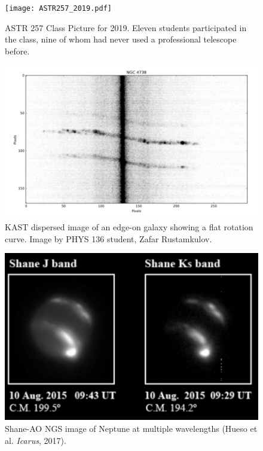\documentclass[12pt]{article}
\begin{document}
\newpage

\begin{figure}[t!]
  \centering
\texttt{[image: ASTR257\_2019.pdf]}
  \caption{ASTR 257 Class Picture for 2019.  Eleven students participated in the class, nine of whom had never used a professional telescope before.}
\end{figure}

\begin{figure}[t!]
  \centering
\includegraphics[width=15cm]{fig1.pdf}
  \caption{KAST dispersed image of an edge-on galaxy showing a flat rotation curve.  Image by PHYS 136 student, Zafar Rustamkulov.}
\end{figure}

\begin{figure}[t!]
  \centering
\includegraphics[width=15cm]{fig2.pdf}
  \caption{Shane-AO NGS image of Neptune at multiple wavelengths (Hueso et al. \textit{Icarus}, 2017).}
\end{figure}
\end{document}
